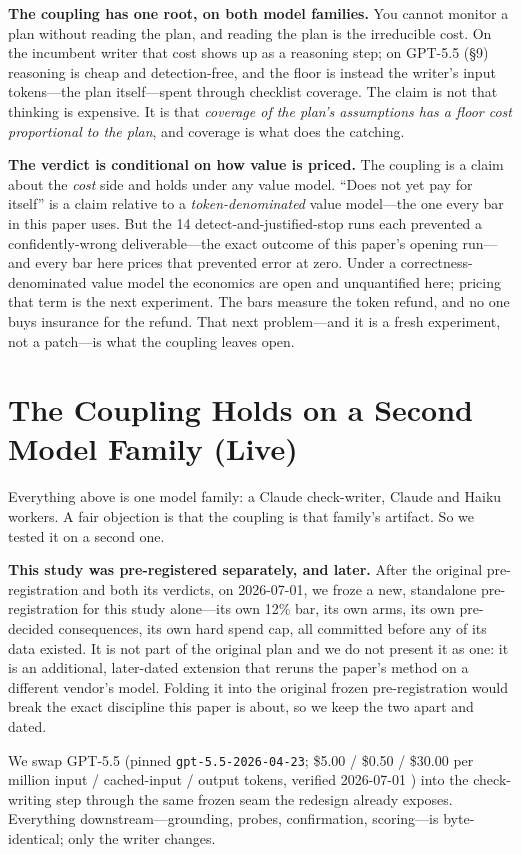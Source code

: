 \documentclass[acmsmall,screen]{acmart}
\begin{document}
\textbf{The coupling has one root, on both model families.} You cannot monitor a
plan without reading the plan, and reading the plan is the irreducible cost. On
the incumbent writer that cost shows up as a reasoning step; on GPT-5.5 (\S9)
reasoning is cheap and detection-free, and the floor is instead the writer's
input tokens---the plan itself---spent through checklist coverage. The claim is
not that thinking is expensive. It is that \emph{coverage of the plan's
assumptions has a floor cost proportional to the plan}, and coverage is what does
the catching.

\textbf{The verdict is conditional on how value is priced.} The coupling is a
claim about the \emph{cost} side and holds under any value model. ``Does not yet
pay for itself'' is a claim relative to a \emph{token-denominated} value
model---the one every bar in this paper uses. But the 14 detect-and-justified-stop
runs each prevented a confidently-wrong deliverable---the exact outcome of this
paper's opening run---and every bar here prices that prevented error at zero.
Under a correctness-denominated value model the economics are open and
unquantified here; pricing that term is the next experiment. The bars measure the
token refund, and no one buys insurance for the refund. That next problem---and it
is a fresh experiment, not a patch---is what the coupling leaves open.

\section{The Coupling Holds on a Second Model Family (Live)}
Everything above is one model family: a Claude check-writer, Claude and Haiku
workers. A fair objection is that the coupling is that family's artifact. So we
tested it on a second one.

\textbf{This study was pre-registered separately, and later.} After the original
pre-registration and both its verdicts, on 2026-07-01, we froze a new, standalone
pre-registration for this study alone---its own 12\% bar, its own arms, its own
pre-decided consequences, its own hard spend cap, all committed before any of its
data existed. It is not part of the original plan and we do not present it as one:
it is an additional, later-dated extension that reruns the paper's method on a
different vendor's model. Folding it into the original frozen pre-registration
would break the exact discipline this paper is about, so we keep the two apart
and dated.

We swap GPT-5.5 (pinned \texttt{gpt-5.5-2026-04-23}; \$5.00 / \$0.50 / \$30.00 per
million input / cached-input / output tokens, verified 2026-07-01 \cite{ref38})
into the check-writing step through the same frozen seam the redesign already
exposes. Everything downstream---grounding, probes, confirmation, scoring---is
byte-identical; only the writer changes.
\end{document}
